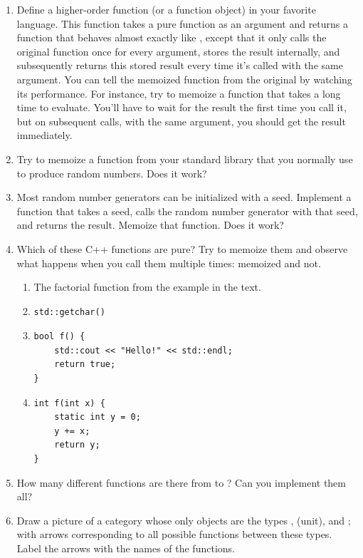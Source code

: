 \begin{enumerate}
\tightlist
\item
  Define a higher-order function (or a function object) 
  in your favorite language. This function takes a pure function
   as an argument and returns a function that behaves almost
  exactly like , except that it only calls the original
  function once for every argument, stores the result internally, and
  subsequently returns this stored result every time it's called with
  the same argument. You can tell the memoized function from the
  original by watching its performance. For instance, try to memoize a
  function that takes a long time to evaluate. You'll have to wait for
  the result the first time you call it, but on subsequent calls, with
  the same argument, you should get the result immediately.
\item
  Try to memoize a function from your standard library that you normally
  use to produce random numbers. Does it work?
\item
  Most random number generators can be initialized with a seed.
  Implement a function that takes a seed, calls the random number
  generator with that seed, and returns the result. Memoize that
  function. Does it work?
\item
  Which of these C++ functions are pure? Try to memoize them and observe
  what happens when you call them multiple times: memoized and not.

  \begin{enumerate}
  \tightlist
  \item
    The factorial function from the example in the text.
  \item
\begin{Verbatim}
std::getchar()
\end{Verbatim}
  \item
\begin{Verbatim}
bool f() { 
    std::cout << "Hello!" << std::endl;
    return true;
}
\end{Verbatim}
  \item
\begin{Verbatim}
int f(int x) {
    static int y = 0;
    y += x;
    return y;
}
\end{Verbatim}
  \end{enumerate}
\item
  How many different functions are there from  to
  ? Can you implement them all?
\item
  Draw a picture of a category whose only objects are the types
  , \code{()} (unit), and ; with arrows
  corresponding to all possible functions between these types. Label the
  arrows with the names of the functions.
\end{enumerate}